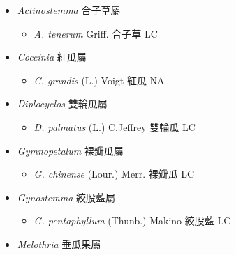 
  \begin{itemize}
 \item[] \textit{Actinostemma} 合子草屬
                                
  \begin{itemize}
        \item[] \textit{A. tenerum} Griff.  合子草   LC
  \end{itemize}
 \item[] \textit{Coccinia} 紅瓜屬
                                
  \begin{itemize}
        \item[] \textit{C. grandis} (L.) Voigt  紅瓜   NA
  \end{itemize}
 \item[] \textit{Diplocyclos} 雙輪瓜屬
                                
  \begin{itemize}
        \item[] \textit{D. palmatus} (L.) C.Jeffrey  雙輪瓜   LC
  \end{itemize}
 \item[] \textit{Gymnopetalum} 裸瓣瓜屬
                                
  \begin{itemize}
        \item[] \textit{G. chinense} (Lour.) Merr.  裸瓣瓜   LC
  \end{itemize}
 \item[] \textit{Gynostemma} 絞股藍屬
                                
  \begin{itemize}
        \item[] \textit{G. pentaphyllum} (Thunb.) Makino  絞股藍   LC
  \end{itemize}
 \item[] \textit{Melothria} 垂瓜果屬
                                

\end{itemize}
